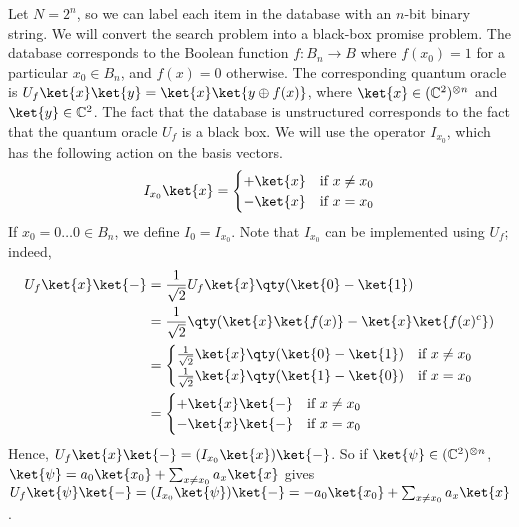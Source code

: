 Let $N = 2^n$, so we can label each item in the database with an $n$-bit binary string.
We will convert the search problem into a black-box promise problem.
The database corresponds to the Boolean function $f \colon B_n \to B$ where $f(x_0) = 1$ for a particular $x_0 \in B_n$, and $f(x) = 0$ otherwise.
The corresponding quantum oracle is $U_f \ket{x} \ket{y} = \ket{x} \ket{y \oplus f(x)}$, where $\ket{x} \in (\mathbb C^2)^{\otimes n}$ and $\ket{y} \in \mathbb C^2$.
The fact that the database is unstructured corresponds to the fact that the quantum oracle $U_f$ is a black box.
We will use the operator $I_{x_0}$, which has the following action on the basis vectors.
\[ I_{x_0} \ket{x} = \begin{cases}
    +\ket{x} & \text{if } x \neq x_0 \\
    -\ket{x} & \text{if } x = x_0
\end{cases} \]
If $x_0 = 0\dots 0 \in B_n$, we define $I_0 = I_{x_0}$.
Note that $I_{x_0}$ can be implemented using $U_f$; indeed,
\begin{align*}
    U_f \ket{x} \ket{-} &= \frac{1}{\sqrt{2}} U_f \ket{x} \qty(\ket{0} - \ket{1}) \\
    &= \frac{1}{\sqrt{2}}\qty(\ket{x} \ket{f(x)} - \ket{x} \ket{f(x)^c}) \\
    &= \begin{cases}
        \frac{1}{\sqrt{2}} \ket{x} \qty(\ket{0} - \ket{1}) & \text{if } x \neq x_0 \\
        \frac{1}{\sqrt{2}} \ket{x} \qty(\ket{1} - \ket{0}) & \text{if } x = x_0
    \end{cases} \\
    &= \begin{cases}
        +\ket{x}\ket{-} & \text{if } x \neq x_0 \\
        -\ket{x}\ket{-} & \text{if } x = x_0
    \end{cases}
\end{align*}
Hence, $U_f \ket{x} \ket{-} = (I_{x_0} \ket{x})\ket{-}$.
So if $\ket{\psi} \in (\mathbb C^2)^{\otimes n}$, $\ket{\psi} = a_0 \ket{x_0} + \sum_{x \neq x_0} a_x \ket{x}$ gives $U_f \ket{\psi}\ket{-} = (I_{x_0} \ket{\psi}) \ket{-} = -a_0 \ket{x_0} + \sum_{x \neq x_0} a_x \ket{x}$.


